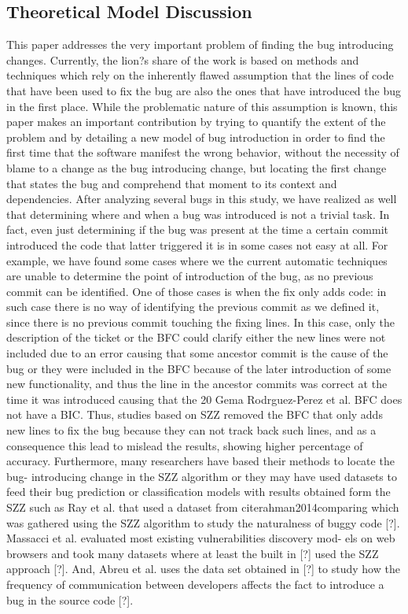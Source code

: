\documentclass[a4paper, 12pt]{book}
\begin{document}
\subsection{Theoretical Model Discussion}
\label{subsec:implicationsModel}

This paper addresses the very important problem of finding the bug introducing changes. Currently, the lion?s share of the work is based on methods and techniques which rely on the inherently flawed assumption that the lines of code that have been used to fix the bug are also the ones that have introduced the bug in the first place. While the problematic nature of this assumption is known, this paper makes an important contribution by trying to quantify the extent of the problem and by detailing a new model of bug introduction in order to find the first time that the software manifest the wrong behavior, without the necessity of blame to a change as the bug introducing change, but locating the first change that states the bug and comprehend that moment to its context and dependencies.
After analyzing several bugs in this study, we have realized as well that determining where and when a bug was introduced is not a trivial task. In fact, even just determining if the bug was present at the time a certain commit introduced the code that latter triggered it is in some cases not easy at all.
For example, we have found some cases where we the current automatic techniques are unable to determine the point of introduction of the bug, as no previous commit can be identified. One of those cases is when the fix only adds code: in such case there is no way of identifying the previous commit as we defined it, since there is no previous commit touching the fixing lines. In this case, only the description of the ticket or the BFC could clarify either the new lines were not included due to an error causing that some ancestor commit is the cause of the bug or they were included in the BFC because of the later introduction of some new functionality, and thus the line in the ancestor commits was correct at the time it was introduced causing that the
20 Gema Rodrguez-Perez et al.
 BFC does not have a BIC. Thus, studies based on SZZ removed the BFC that only adds new lines to fix the bug because they can not track back such lines, and as a consequence this lead to mislead the results, showing higher percentage of accuracy.
Furthermore, many researchers have based their methods to locate the bug- introducing change in the SZZ algorithm or they may have used datasets to feed their bug prediction or classification models with results obtained form the SZZ such as Ray et al. that used a dataset from citerahman2014comparing which was gathered using the SZZ algorithm to study the naturalness of buggy code [?]. Massacci et al. evaluated most existing vulnerabilities discovery mod- els on web browsers and took many datasets where at least the built in [?] used the SZZ approach [?]. And, Abreu et al. uses the data set obtained in [?] to study how the frequency of communication between developers affects the fact to introduce a bug in the source code [?].
\end{document}
